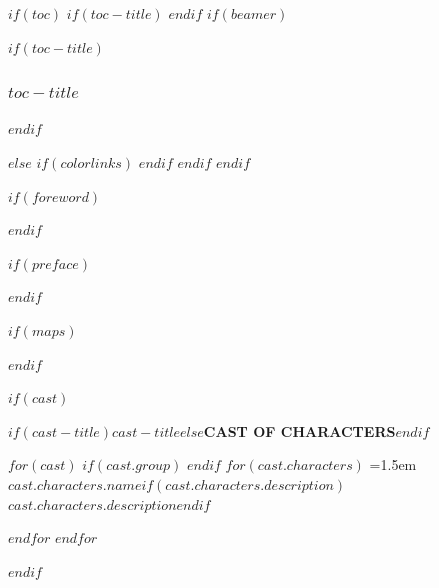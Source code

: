 $if(toc)$
    $if(toc-title)$
      \renewcommand*\contentsname{$toc-title$}
    $endif$
    $if(beamer)$
      \begin{frame}[allowframebreaks]
      $if(toc-title)$
        \frametitle{$toc-title$}
      $endif$
      \tableofcontents[hideallsubsections]
      \end{frame}
    $else$
      {
      $if(colorlinks)$
        \hypersetup{linkcolor=$if(toccolor)$$toccolor$$else$$endif$}
      $endif$
      \setcounter{tocdepth}{$toc-depth$}
      \tableofcontents
      }
    $endif$
$endif$

$if(foreword)$


\clearpage{\thispagestyle{empty}\cleardoublepage}
$endif$

$if(preface)$


\clearpage{\thispagestyle{empty}\cleardoublepage}
$endif$

$if(maps)$

$endif$

$if(cast)$
    \pagestyle{empty}
    \cleardoublepage
    \thispagestyle{empty}
    \vspace*{2\baselineskip}
    {\centering\chapterheadingfont\bfseries\large{}\MakeTextUppercase{$if(cast-title)$$cast-title$$else$Cast of Characters$endif$}\par}
    \vspace{18pt}
    {\primaryfont\normalsize\setlength{\parindent}{0pt}\setlength{\parskip}{5pt}\raggedright
    $for(cast)$
    $if(cast.group)$
    \vspace{12pt}{\centering\itshape $cast.group$\par}\nopagebreak[4]\vspace{4pt}
    $endif$
    $for(cast.characters)$
    \hangindent=1.5em \textsc{$cast.characters.name$}$if(cast.characters.description)$~\textemdash{} $cast.characters.description$$endif$\par
    $endfor$
    $endfor$
    }
    \clearpage
$endif$

